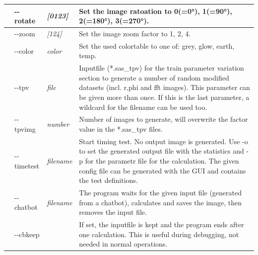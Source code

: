 \documentclass[11pt]{article} %
\begin{document}
\begin{longtable}{|L{1cm}|L{2cm}|C{2cm}|L{12cm}|}
 & -{}-rotate & {\it [0123]} & Set the image ratoation to 0(=0°), 1(=90°), 2(=180°), 3(=270°). \\ \hline
 & -{}-zoom & {\it [124]} & Set the image zoom factor to 1, 2, 4. \\ \hline
 & -{}-color & {\it color} & Set the used colortable to one of: grey, glow, earth, temp. \\ \hline
 & -{}-tpv & {\it file} & Inputfile (*.sas\_tpv) for the train parameter variation section to generate a number of random modified datasets (incl. r,phi and fft images). This parameter can be given more than once. If this is the last parameter, a wildcard for the filename can be used too. \\ \hline
 & -{}-tpvimg & {\it number} & Number of images to generate, will overwrite the factor value in the *.sas\_tpv files. \\ \hline
 & -{}-timetest & {\it filename} & Start timing test. No output image is generated. Use -o to set the generated output file with the statistics and -p for the parametr file for the calculation. The given config file can be generated with the GUI and contains the test definitions. \\ \hline
 & -{}-chatbot & {\it filename} & The program waits for the given input file (generated from a chatbot), calculates and saves the image, then removes the input file. \\ \hline
 & -{}-cbkeep & & If set, the inputfile is kept and the program ends after one calculation. This is useful during debugging, not needed in normal operations. \\ \hline
\end{longtable}
\end{document}
